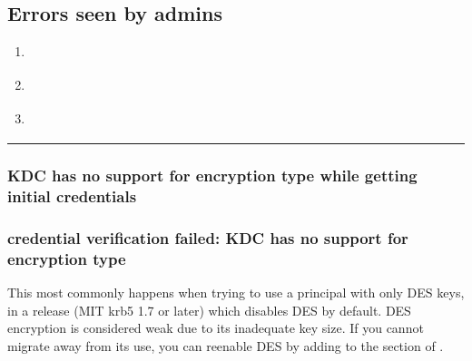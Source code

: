 \documentclass[letterpaper,10pt,english]{sphinxmanual}
\begin{document}
\subsection{Errors seen by admins}
\label{\detokenize{admin/troubleshoot:errors-seen-by-admins}}\label{\detokenize{admin/troubleshoot:prop-failed-start}}\begin{enumerate}
%
\item {} 
\sphinxAtStartPar
{\hyperref[\detokenize{admin/troubleshoot:kprop-no-route}]{}}

\item {} 
\sphinxAtStartPar
{\hyperref[\detokenize{admin/troubleshoot:kprop-con-refused}]{}}

\item {} 
\sphinxAtStartPar
{\hyperref[\detokenize{admin/troubleshoot:kprop-sendauth-exchange}]{}}

\end{enumerate}
\label{\detokenize{admin/troubleshoot:prop-failed-end}}

\bigskip\hrule\bigskip



\subsubsection{KDC has no support for encryption type while getting initial credentials}
\label{\detokenize{admin/troubleshoot:kdc-has-no-support-for-encryption-type-while-getting-initial-credentials}}\label{\detokenize{admin/troubleshoot:init-creds-etype-nosupp}}

\subsubsection{credential verification failed: KDC has no support for encryption type}
\label{\detokenize{admin/troubleshoot:credential-verification-failed-kdc-has-no-support-for-encryption-type}}\label{\detokenize{admin/troubleshoot:cert-chain-etype-nosupp}}
\sphinxAtStartPar
This most commonly happens when trying to use a principal with only
DES keys, in a release (MIT krb5 1.7 or later) which disables DES by
default.  DES encryption is considered weak due to its inadequate key
size.  If you cannot migrate away from its use, you can re\sphinxhyphen{}enable DES
by adding  to the {\hyperref[\detokenize{admin/conf_files/krb5_conf:libdefaults}]{}}
section of {\hyperref[\detokenize{admin/conf_files/krb5_conf:krb5-conf-5}]{}}.
\end{document}
